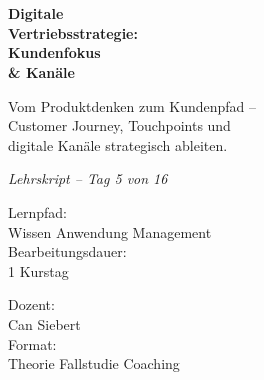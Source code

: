 \documentclass[11pt,a4paper,oneside]{article}
\newcommand{\caveatfontfallback}{\itshape}
\newcommand\caveatfont{\caveatfontfallback}%
\begin{document}
\begin{titlepage}
  \pagestyle{empty}
  \vspace*{1.5cm}
  \\[2pt]
  \noindent{\color{lpAccent}\rule{\linewidth}{1.2pt}}\\[4pt]

  \vspace{3cm}
  {\sffamily\fontsize{30}{34}\selectfont\bfseries\color{lpInk}Digitale\\Vertriebsstrategie:\\Kundenfokus\\\& Kanäle\par}

  \vspace{0.7cm}
  {\sffamily\large\color{lpGray}Vom Produktdenken zum Kundenpfad --\\Customer Journey, Touchpoints und\\digitale Kanäle strategisch ableiten.\par}

  \vspace{1.5cm}
  {\caveatfont\LARGE\color{lpAmber}Lehrskript -- Tag 5 von 16}\par

  \vfill

  \noindent\begin{minipage}{0.55\linewidth}
    {\sffamily\footnotesize\color{lpGray}Lernpfad:}\\
    {\sffamily\small\color{lpInk}Wissen \textrightarrow{} Anwendung \textrightarrow{} Management}\\[10pt]
    {\sffamily\footnotesize\color{lpGray}Bearbeitungsdauer:}\\
    {\sffamily\small\color{lpInk}1 Kurstag}
  \end{minipage}\hfill
  \begin{minipage}{0.4\linewidth}
    \raggedleft
    {\sffamily\footnotesize\color{lpGray}Dozent:}\\
    {\sffamily\small\color{lpInk}Can Siebert}\\[10pt]
    {\sffamily\footnotesize\color{lpGray}Format:}\\
    {\sffamily\small\color{lpInk}Theorie \textperiodcentered{} Fallstudie \textperiodcentered{} Coaching}
  \end{minipage}

  \vspace{0.5cm}
  \noindent{\color{lpAccent}\rule{\linewidth}{0.6pt}}
\end{titlepage}
\end{document}
